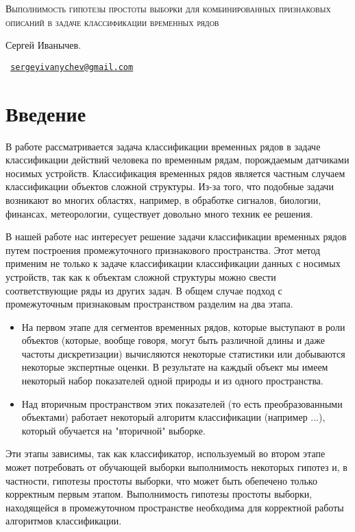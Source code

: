 \documentclass[a4paper, 10pt]{article}
\newcommand{\ivtitle}[3]{
    \begin{center}
    \vspace{2.6cm}
    \textsc{\LARGE #1}

    \vspace{0.6cm}
    { #2}

\texttt{\small
    \href{ #3 }{#3}
}
    \vspace{0.6cm}
    \end{center}
        \noindent\makebox[\linewidth]{\rule{\textwidth}{0.4pt}}
}
\begin{document}
\ivtitle{Выполнимость гипотезы простоты выборки для комбинированных
признаковых описаний в задаче классификации временных рядов}{Сергей Иванычев.}{sergeyivanychev@gmail.com}

\tableofcontents

\section{Введение}

В работе рассматривается задача классификации временных рядов в задаче
классификации действий человека по временным рядам, порождаемым датчиками носимых устройств.
Классификация временных рядов является частным случаем классификации
объектов сложной структуры. Из-за того, что подобные задачи возникают во
многих областях, например, в обработке сигналов, биологии, финансах,
метеорологии, существует довольно много техник ее решения.

В нашей работе нас интересует решение задачи классификации временных
рядов путем построения промежуточного признакового пространства. Этот метод
применим не только к задаче классификации классификации данных с носимых устройств,
так как к объектам сложной структуры можно свести соответствующие ряды из других задач.
В общем случае подход с промежуточным признаковым пространством разделим на два этапа.

\begin{itemize}
    \item На первом этапе для сегментов временных рядов, которые выступают
    в роли объектов (которые, вообще говоря, могут
    быть различной длины и даже частоты дискретизации) вычисляются некоторые статистики
    или добываются некоторые экспертные оценки. В результате на каждый объект
    мы имеем некоторый набор показателей одной природы и из одного пространства.
    \item Над вторичным пространством этих показателей (то есть преобразованными
    объектами) работает некоторый алгоритм классификации (например ...), который
    обучается на "вторичной" выборке.
\end{itemize}

Эти этапы зависимы, так как классификатор, используемый во втором этапе может
потребовать от обучающей выборки выполнимость некоторых гипотез и, в частности,
гипотезы простоты выборки, что может быть обепечено
только корректным первым этапом. Выполнимость гипотезы простоты выборки,
находящейся в промежуточном пространстве необходима для корректной работы алгоритмов
классификации.
\end{document}
